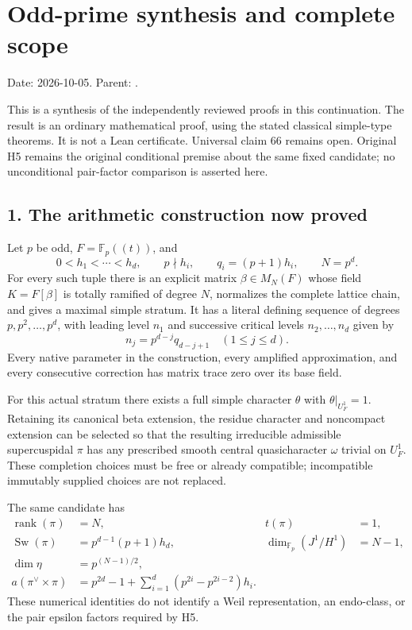 \clearpage
\section{Odd-prime synthesis and complete scope}\label{app:odd_synthesis}

Date: 2026-10-05. Parent: .

This is a synthesis of the independently reviewed proofs in this
continuation. The result is an ordinary mathematical proof, using the
stated classical simple-type theorems. It is not a Lean certificate.
Universal claim 66 remains open. Original H5 remains the original
conditional premise about the same fixed candidate; no unconditional
pair-factor comparison is asserted here.

\hypertarget{odd_synthesis-the-arithmetic-construction-now-proved}{%
\subsection{1. The arithmetic construction now
proved}\label{odd_synthesis-the-arithmetic-construction-now-proved}}

Let \(p\) be odd, \(F=\mathbb F_p((t))\), and \[
0<h_1<\cdots<h_d,\qquad p\nmid h_i,\qquad
q_i=(p+1)h_i,\qquad N=p^d.
\] For every such tuple there is an explicit matrix \(\beta\in M_N(F)\)
whose field \(K=F[\beta]\) is totally ramified of degree \(N\),
normalizes the complete lattice chain, and gives a maximal simple
stratum. It has a literal defining sequence of degrees
\(p,p^2,\ldots,p^d\), with leading level \(n_1\) and successive critical
levels \(n_2,\ldots,n_d\) given by \[
n_j=p^{d-j}q_{d-j+1}\quad(1\le j\le d).
\] Every native parameter in the construction, every amplified
approximation, and every consecutive correction has matrix trace zero
over its base field.

For this actual stratum there exists a full simple character \(\theta\)
with \(\theta|_{U_F^1}=1\). Retaining its canonical beta extension, the
residue character and noncompact extension can be selected so that the
resulting irreducible admissible supercuspidal \(\pi\) has any
prescribed smooth central quasicharacter \(\omega\) trivial on
\(U_F^1\). These completion choices must be free or already compatible;
incompatible immutably supplied choices are not replaced.

The same candidate has \[
\begin{aligned}
\operatorname{rank}(\pi)&=N, &t(\pi)&=1,\\
\operatorname{Sw}(\pi)&=p^{d-1}(p+1)h_d, &
\dim_{\mathbb F_p}(J^1/H^1)&=N-1,\\
\dim\eta&=p^{(N-1)/2},\\
a(\pi^\vee\times\pi)
 &=p^{2d}-1+\sum_{i=1}^d(p^{2i}-p^{2i-2})h_i.
\end{aligned}
\] These numerical identities do not identify a Weil representation, an
endo-class, or the pair epsilon factors required by H5.

